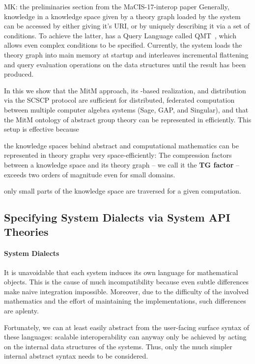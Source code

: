\begin{newpart}{MK: the preliminaries section from the MaCIS-17-interop paper}
Generally, knowledge in a knowledge space given by a theory graph loaded by the \mmt system can be accessed by either giving it's \mmt URI, or by uniquely describing it via a set of conditions. 
To achieve the latter, \mmt has a Query Language called QMT~\cite{Rabe:qlfml12}, which allows even complex conditions to be specified. 
Currently, the \mmt system loads the theory graph into main memory at startup and interleaves incremental flattening and query evaluation operations on the \mmt data structures until the result has been produced. 

In this \papertype we show that the MitM approach, its \ommt-based realization, and
distribution via the SCSCP protocol are sufficient for distributed, federated computation
between multiple computer algebra systems (Sage, GAP, and Singular), and that the MitM
ontology of abstract group theory can be represented in \ommt efficiently. This setup is
effective because
\begin{compactitem}
\item the knowledge spaces behind abstract and computational mathematics can be represented in theory graphs very space-efficiently: The compression factors between a knowledge space and its theory graph -- we call it the \textbf{TG factor} -- exceeds two orders of magnitude even for small domains.
\item only small parts of the knowledge space are traversed for a given computation. 
\end{compactitem}

\subsection{Specifying System Dialects via System API Theories}\label{sec:mitm:dialect}

\paragraph{System Dialects}
It is unavoidable that each system induces its own language for mathematical objects.
This is the cause of much incompatibility because even subtle differences make naive integration impossible.
Moreover, due to the difficulty of the involved mathematics and the effort of maintaining the implementations, such differences are aplenty.

Fortunately, we can at least easily abstract from the user-facing surface syntax of these languages:
scalable interoperability can anyway only be achieved by acting on the internal data structures of the systems.
Thus, only the much simpler internal abstract syntax needs to be considered.


\end{newpart}
